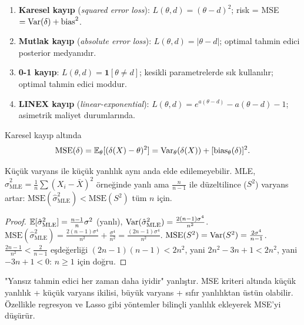 \begin{ornek}\label{ex:kayip_ornekleri}
\begin{enumerate}
  \item \textbf{Karesel kayıp} (\emph{squared error loss}): $L(\theta,d)=(\theta-d)^2$; risk = MSE $= \operatorname{Var}(\delta)+\text{bias}^2$.
  \item \textbf{Mutlak kayıp} (\emph{absolute error loss}): $L(\theta,d)=|\theta-d|$; optimal tahmin edici posterior medyanıdır.
  \item \textbf{0-1 kayıp}: $L(\theta,d)=\mathbf{1}[\theta\neq d]$; kesikli parametrelerde sık kullanılır; optimal tahmin edici moddur.
  \item \textbf{LINEX kayıp} (\emph{linear-exponential}): $L(\theta,d)=e^{a(\theta-d)}-a(\theta-d)-1$; asimetrik maliyet durumlarında.
\end{enumerate}
\end{ornek}

\begin{tanim}\label{def:mse_ayrisim}
Karesel kayıp altında
\[
  \mathrm{MSE}(\delta) = \mathbb{E}_\theta[(\delta(X)-\theta)^2]
  = \operatorname{Var}_\theta(\delta(X)) + [\mathrm{bias}_\theta(\delta)]^2.
\]
\end{tanim}

\begin{teorem}\label{thm:yanlı_varyans}
Küçük varyans ile küçük yanlılık aynı anda elde edilemeyebilir. MLE, $\hat\sigma^2_{\mathrm{MLE}}=\frac{1}{n}\sum(X_i-\bar X)^2$ örneğinde yanlı ama $\frac{n}{n-1}$ ile düzeltilince ($S^2$) varyans artar: $\mathrm{MSE}(\hat\sigma^2_{\mathrm{MLE}})<\mathrm{MSE}(S^2)$ tüm $n$ için.
\end{teorem}

\begin{proof}
$\mathbb{E}[\hat\sigma^2_{\mathrm{MLE}}]=\frac{n-1}{n}\sigma^2$ (yanlı), $\operatorname{Var}(\hat\sigma^2_{\mathrm{MLE}})=\frac{2(n-1)\sigma^4}{n^2}$.
$\mathrm{MSE}(\hat\sigma^2_{\mathrm{MLE}})=\frac{2(n-1)\sigma^4}{n^2}+\frac{\sigma^4}{n^2}=\frac{(2n-1)\sigma^4}{n^2}$.
$\mathrm{MSE}(S^2)=\operatorname{Var}(S^2)=\frac{2\sigma^4}{n-1}$.
$\frac{2n-1}{n^2}<\frac{2}{n-1}$ eşdeğerliği $(2n-1)(n-1)<2n^2$, yani $2n^2-3n+1<2n^2$, yani $-3n+1<0$: $n\geq1$ için doğru.
\end{proof}

\begin{hataanalizi}
"Yansız tahmin edici her zaman daha iyidir" yanlıştır. MSE kriteri altında küçük yanlılık + küçük varyans ikilisi, büyük varyans + sıfır yanlılıktan üstün olabilir. Özellikle regresyon ve Lasso gibi yöntemler bilinçli yanlılık ekleyerek MSE'yi düşürür.
\end{hataanalizi}

